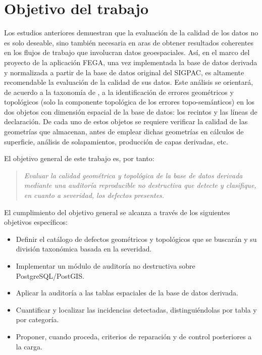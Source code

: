 \section{Objetivo del trabajo}
Los estudios anteriores demuestran que la evaluación de la calidad de los datos no es solo deseable, sino también necesaria en aras de obtener resultados coherentes en los flujos de trabajo que involucran datos geoespaciales. Así, en el marco del proyecto de la aplicación FEGA, una vez implementada la base de datos derivada y normalizada  a partir de la base de datos original del SIGPAC, es altamente recomendable la evaluación de la calidad de sus datos. Este análisis se orientará, de acuerdo a la taxonomía de \cite{servigne_methodology_2000}, a la identificación de errores geométricos y topológicos (solo la componente topológica de los errores topo-semánticos) en los dos objetos con dimensión espacial de la base de datos: los recintos y las líneas de declaración. De cada uno de estos objetos se requiere verificar la calidad de las geometrías que almacenan, antes de emplear dichas geometrías en cálculos de superficie, análisis de solapamientos, producción de capas derivadas, etc.

El objetivo general de este trabajo es, por tanto:

\begin{quote}
	\textit{Evaluar la calidad geométrica y topológica de la base de datos derivada mediante una auditoría reproducible no destructiva que detecte y clasifique, en cuanto a severidad, los defectos presentes.}
\end{quote}

El cumplimiento del objetivo general se alcanza a través de los siguientes objetivos específicos:

\begin{itemize}[leftmargin=1.5em]
	\item Definir el catálogo de defectos geométricos y topológicos que se buscarán y su división taxonómica basada en la severidad.
	\item Implementar un módulo de auditoría no destructiva sobre PostgreSQL/PostGIS.
	\item Aplicar la auditoría a las tablas espaciales de la base de datos derivada.
	\item Cuantificar y localizar las incidencias detectadas, distinguiéndolas por tabla y por categoría.
	\item Proponer, cuando proceda, criterios de reparación y de control posteriores a la carga.
\end{itemize}

